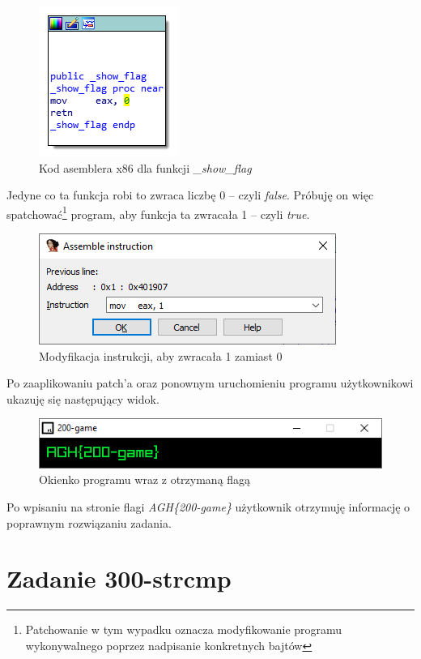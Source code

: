 \documentclass[language=polish,type=eng]{aghmodern}
\begin{document}
\begin{figure}[H]
\centering
\includegraphics{200_ida_show_flag}
\caption{Kod asemblera x86 dla funkcji \emph{\_show\_flag}}
\end{figure}

Jedyne co ta funkcja robi to zwraca liczbę 0 -- czyli \emph{false}.
Próbuję on więc spatchować\footnote{Patchowanie w tym wypadku oznacza modyfikowanie programu
wykonywalnego poprzez nadpisanie konkretnych bajtów}
program, aby funkcja ta zwracała 1 -- czyli \emph{true}.

\begin{figure}[H]
\centering
\includegraphics{200_ida_patch}
\caption{Modyfikacja instrukcji, aby zwracała 1 zamiast 0}
\end{figure}

Po zaaplikowaniu patch'a oraz ponownym uruchomieniu programu użytkownikowi ukazuję się
następujący widok.

\begin{figure}[H]
\centering
\includegraphics{200_flag}
\caption{Okienko programu wraz z otrzymaną flagą}
\end{figure}

Po wpisaniu na stronie flagi \emph{AGH\{200-game\}} użytkownik otrzymuję informację
o poprawnym rozwiązaniu zadania.

\section{Zadanie 300-strcmp}
\end{document}
